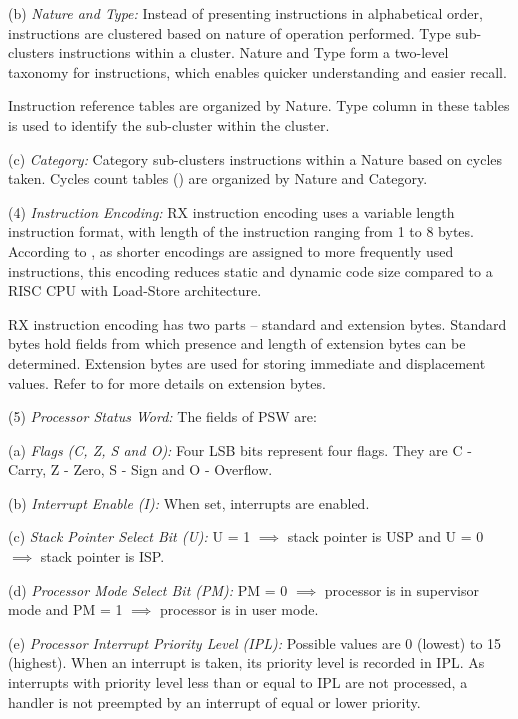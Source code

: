     (b) \emph{Nature and Type:} %
    Instead of presenting instructions in alphabetical order, instructions are clustered based on nature
    of operation performed. Type sub-clusters instructions within a cluster. Nature and Type form a 
    two-level taxonomy for instructions, which enables quicker understanding and easier recall.

    Instruction reference tables are organized by Nature. Type column in these tables is used to identify 
    the sub-cluster within the cluster.

    (c) \emph{Category:} %
    Category sub-clusters instructions within a Nature based on cycles taken. Cycles count tables 
    () are organized by Nature and Category.

\levelone
(4) \emph{Instruction Encoding:} %
RX instruction encoding uses a variable length instruction format, with length of the instruction 
ranging from 1 to 8 bytes. According to \cite{rxv3_details}, as shorter encodings are assigned to 
more frequently used instructions, this encoding reduces static and dynamic code size compared to 
a RISC CPU with Load-Store architecture.

RX instruction encoding has two parts -- standard and extension bytes. Standard bytes hold fields 
from which presence and length of extension bytes can be determined. Extension bytes are used for 
storing immediate and displacement values. Refer to 
 for more details on extension bytes.

(5) \emph{Processor Status Word:} %
The fields of PSW are:

    \leveltwo
    (a) \emph{Flags (C, Z, S and O):} %
    Four LSB bits represent four flags. They are C - Carry, Z - Zero, S - Sign and O - Overflow.

    (b) \emph{Interrupt Enable (I):} %
    When set, interrupts are enabled. 

    (c) \emph{Stack Pointer Select Bit (U):} %
    U = 1 $\implies$ stack pointer is USP and U = 0 $\implies$ stack pointer is ISP.

    (d) \emph{Processor Mode Select Bit (PM):} %
    PM = 0 $\implies$ processor is in supervisor mode and PM = 1 $\implies$ processor is in user
    mode.

    (e) \emph{Processor Interrupt Priority Level (IPL):} %
    Possible values are 0 (lowest) to 15 (highest). When an interrupt is taken, its priority 
    level is recorded in IPL. As interrupts with priority level less than or equal to IPL 
    are not processed, a handler is not preempted by an interrupt of equal or lower priority.

